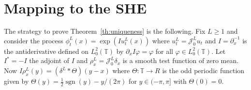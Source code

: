 \documentclass[a4paper,11pt]{article}
\newcommand{\tmop}[1]{\ensuremath{\operatorname{#1}}}
\newcommand{\JJ}{\mathcal{J}}
\begin{document}
\section{Mapping to the SHE}

The strategy to prove Theorem~\ref{th:uniqueness} is the following. Fix $L
\geqslant 1$ and consider the process $\phi_t^L (x) = \exp (I u_t^L (x))$
where $u_t^L = \JJ^L_0 u_t$ and $I = \partial_x^{- 1}$ is the antiderivative
defined on $L^2_0 (\mathbb{T})$ by $\partial_x I \varphi = \varphi$ for all
$\varphi \in L^2_0 (\mathbb{T})$. Let $I^{\ast} = - I$ the adjoint of $I$ and
$\rho_x^L = \JJ^L_0 \delta_x$ is a smooth test function of zero mean. Now $I
\rho^L_x (y) = (\delta^L \ast \Theta) (y - x)$ where $\Theta : \mathbb{T}
\rightarrow R$ is the odd periodic function given by $\Theta (y) = \frac{1}{2}
\tmop{sgn} (y) - y / (2 \pi)$ for $y \in (- \pi, \pi]$ with $\Theta (0) = 0$.
\end{document}
